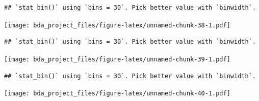 \documentclass[
]{article}
\newenvironment{Shaded}{\begin{snugshade}}{\end{snugshade}}
\newcommand{\AttributeTok}[1]{\textcolor[rgb]{0.77,0.63,0.00}{#1}}
\newcommand{\DecValTok}[1]{\textcolor[rgb]{0.00,0.00,0.81}{#1}}
\newcommand{\FunctionTok}[1]{\textcolor[rgb]{0.00,0.00,0.00}{#1}}
\newcommand{\NormalTok}[1]{#1}
\newcommand{\SpecialCharTok}[1]{\textcolor[rgb]{0.00,0.00,0.00}{#1}}
\newcommand{\StringTok}[1]{\textcolor[rgb]{0.31,0.60,0.02}{#1}}
\begin{document}
\begin{verbatim}
## `stat_bin()` using `bins = 30`. Pick better value with `binwidth`.
\end{verbatim}

\texttt{[image: bda\_project\_files/figure-latex/unnamed-chunk-38-1.pdf]}

\begin{Shaded}
\end{Shaded}

\begin{verbatim}
## `stat_bin()` using `bins = 30`. Pick better value with `binwidth`.
\end{verbatim}

\texttt{[image: bda\_project\_files/figure-latex/unnamed-chunk-39-1.pdf]}

\begin{Shaded}
\end{Shaded}

\begin{verbatim}
## `stat_bin()` using `bins = 30`. Pick better value with `binwidth`.
\end{verbatim}

\texttt{[image: bda\_project\_files/figure-latex/unnamed-chunk-40-1.pdf]}

\begin{Shaded}
\end{Shaded}
\end{document}
